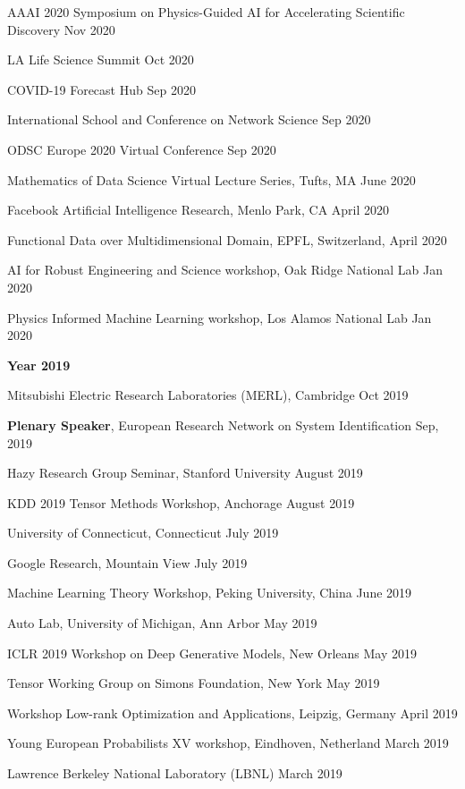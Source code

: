 \documentclass[margin,line]{res}
\begin{document}
\begin{resume}
AAAI 2020 Symposium on Physics-Guided AI for Accelerating Scientific Discovery \hfill{Nov 2020}

LA Life Science Summit \hfill{Oct 2020}

COVID-19 Forecast Hub  \hfill{Sep 2020}
 
International School and Conference on Network Science  \hfill{Sep 2020}
 
 
 ODSC Europe 2020 Virtual Conference \hfill{Sep 2020}

 
 Mathematics of Data Science Virtual Lecture Series, Tufts, MA \hfill{June 2020}
 
 
Facebook Artificial Intelligence Research,  Menlo Park, CA \hfill{April 2020}


 Functional Data over Multidimensional Domain, EPFL, Switzerland,   \hfill{April 2020}
 
 
AI for Robust Engineering and Science workshop,  Oak Ridge National Lab \hfill{Jan 2020}
 
 
Physics Informed Machine Learning workshop,  Los Alamos National Lab \hfill {Jan 2020}


 {\bf Year  2019}
 

Mitsubishi Electric Research Laboratories (MERL), Cambridge  \hfill {Oct  2019}


\textbf{Plenary Speaker},  European Research Network on System Identification   \hfill {Sep, 2019}


Hazy Research Group Seminar,  Stanford University  \hfill {August 2019}

KDD 2019 Tensor Methods Workshop, Anchorage \hfill{August 2019}

University  of Connecticut,   Connecticut \hfill{July 2019}

Google  Research, Mountain View \hfill{July 2019}

Machine Learning Theory Workshop,  Peking University, China  \hfill{June 2019}

Auto Lab, University of Michigan, Ann Arbor  \hfill{May 2019}

ICLR 2019 Workshop on Deep Generative Models, New Orleans  \hfill{May 2019}

Tensor Working Group  on Simons Foundation, New York  \hfill{May  2019}

Workshop Low-rank Optimization and Applications,  Leipzig, Germany \hfill{April 2019}

 Young European Probabilists XV workshop, Eindhoven, Netherland  \hfill{March 2019}
 
 Lawrence Berkeley National Laboratory (LBNL) \hfill{March 2019}


\end{resume}
\end{document}
